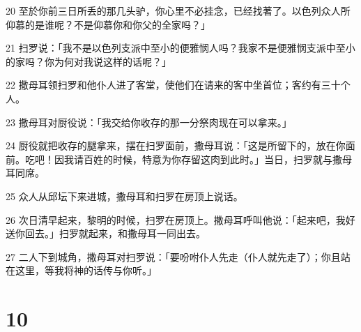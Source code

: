 \par 20 至於你前三日所丢的那几头驴，你心里不必挂念，已经找著了。以色列众人所仰慕的是谁呢？不是仰慕你和你父的全家吗？」
\par 21 扫罗说：「我不是以色列支派中至小的便雅悯人吗？我家不是便雅悯支派中至小的家吗？你为何对我说这样的话呢？」
\par 22 撒母耳领扫罗和他仆人进了客堂，使他们在请来的客中坐首位；客约有三十个人。
\par 23 撒母耳对厨役说：「我交给你收存的那一分祭肉现在可以拿来。」
\par 24 厨役就把收存的腿拿来，摆在扫罗面前，撒母耳说：「这是所留下的，放在你面前。吃吧！因我请百姓的时候，特意为你存留这肉到此时。」当日，扫罗就与撒母耳同席。
\par 25 众人从邱坛下来进城，撒母耳和扫罗在房顶上说话。
\par 26 次日清早起来，黎明的时候，扫罗在房顶上。撒母耳呼叫他说：「起来吧，我好送你回去。」扫罗就起来，和撒母耳一同出去。
\par 27 二人下到城角，撒母耳对扫罗说：「要吩咐仆人先走（仆人就先走了）；你且站在这里，等我将神的话传与你听。」

\chapter{10}

